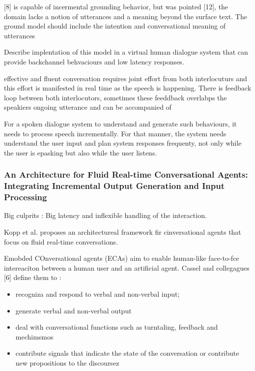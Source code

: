 

[8] is capable of incermental grounding behavior, but was pointed [12], the domain lacks a notion of utterances and a meaning beyond the surface text. The ground model should include the intention and conversational meaning of utterances

Describe implentation of this model in a virtual human dialogue system that can provide backchannel behvaciours and low latency responses.

effective and fluent conversation requires joint effort from both interlocuturs and this effort is manifested in real time as the speech is happening. There is feedback loop between both interlocutors, sometimes these feeddback overlabps the speakiers ongoing utterance and can be accompanied of 

For a spoken dialogue system to understand and generate such behaviours, it needs to process speech incrementally. For that manner, the system needs understand the user input and plan system responses frequenty, not only while the user is epasking but also while the user listens.

\subsubsection*{An Architecture for Fluid Real-time Conversational Agents:
Integrating Incremental Output Generation and Input Processing}

Big culprits : Big latency and inflexible handling of the interaction.

Kopp et al. proposes an architectureal framework fir cinversational agents that focus on fluid real-time conversations.

Emobded COnversational agents (ECAs) aim to enable human-like face-to-fce intereaciton between a human user and an artificial agent. Cassel and collegagues [6] define them to :
\begin{itemize}
	\item recogniza and respond to verbal and non-verbal input;
	\item generate verbal and non-verbal output
	\item deal with conversational functions such as turntaling, feedback and mechimsmos
	\item contribute signals that indicate the state of the conversation or contribute new propositions to the discoursez
\end{itemize}

